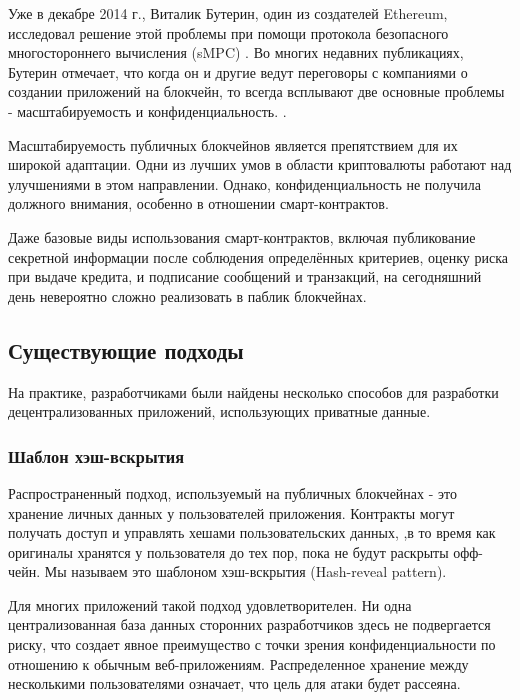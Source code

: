 \documentclass[11pt]{article}
\begin{document}
Уже в декабре 2014 г., Виталик Бутерин, один из создателей Ethereum, 
исследовал решение этой проблемы при помощи протокола безопасного 
многостороннего вычисления (sMPC) \cite{secretSharingDaos}. Во многих 
недавних публикациях, Бутерин отмечает, что когда он и другие ведут 
переговоры с компаниями о создании приложений на блокчейн, то 
всегда всплывают две основные проблемы - масштабируемость и 
конфиденциальность. \cite{privacyOnTheBlockchain}.

Масштабируемость публичных блокчейнов является препятствием для 
их широкой адаптации. Одни из лучших умов в области криптовалюты \cite{lightning}
\cite{ethereumSharding} \cite{plasma} работают над улучшениями 
в этом направлении. Однако, конфиденциальность не получила должного
внимания, особенно в отношении смарт-контрактов.

Даже базовые виды использования смарт-контрактов, включая 
публикование секретной информации после соблюдения определённых 
критериев, оценку риска при выдаче кредита, и подписание сообщений 
и транзакций, на сегодняшний день невероятно сложно реализовать в 
паблик блокчейнах.

\subsection{Существующие подходы}

На практике, разработчиками были найдены несколько способов для
разработки децентрализованных приложений, использующих приватные 
данные.

\subsubsection{Шаблон хэш-вскрытия}

Распространенный подход, используемый на публичных блокчейнах - 
это хранение личных данных у пользователей приложения. 
Контракты могут получать доступ и управлять хешами пользовательских 
данных, \cite{commitmentScheme},в то время как оригиналы хранятся 
у пользователя до тех пор, пока не будут раскрыты офф-чейн. 
Мы называем это шаблоном хэш-вскрытия (Hash-reveal pattern).

Для многих приложений такой подход удовлетворителен. Ни одна 
централизованная база данных сторонних разработчиков здесь не 
подвергается риску, что создает явное преимущество с точки зрения 
конфиденциальности по отношению к обычным веб-приложениям. 
Распределенное хранение между несколькими пользователями означает, 
что цель для атаки будет рассеяна.
\end{document}
